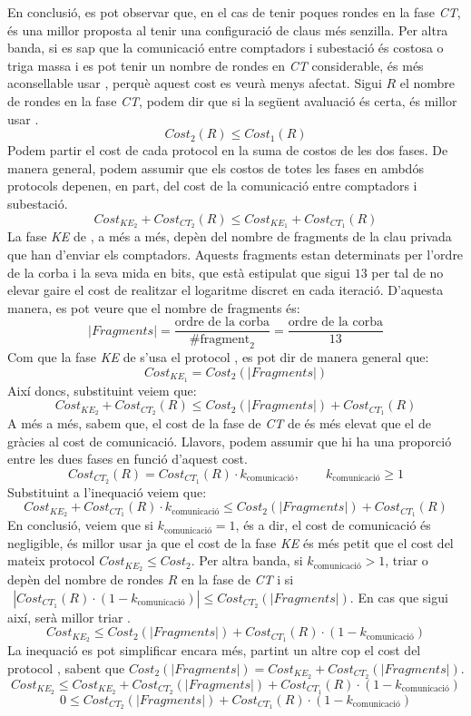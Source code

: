 En conclusió, es pot observar que, en el cas de tenir poques rondes en la fase \textit{CT}, \cite{busom} és una millor proposta al tenir una configuració de claus més senzilla. 
Per altra banda, si es sap que la comunicació entre comptadors i subestació és costosa o triga massa  i es pot tenir un nombre de rondes en \textit{CT} considerable, és més aconsellable usar \cite{recsi}, perquè aquest cost es veurà menys afectat. Sigui $R$ el nombre de rondes en la fase \textit{CT}, podem dir que si la següent avaluació és certa, és millor usar \cite{busom}.
\[Cost_2(R) \le Cost_1(R)\]
Podem partir el cost de cada protocol en la suma de costos de les dos fases. De manera general, podem assumir que els costos de totes les fases en ambdós protocols depenen, en part, del cost de la comunicació entre comptadors i subestació.
\[Cost_{KE_2} + Cost_{CT_2}(R) \le  Cost_{KE_1} + Cost_{CT_1}(R)\]
La fase \textit{KE} de \cite{recsi}, a més a més, depèn del nombre de fragments de la clau privada que han d'enviar els comptadors. Aquests fragments estan determinats per l'ordre de la corba i la seva mida en bits, que està estipulat que sigui $13$ per tal de no elevar gaire el cost de realitzar el logaritme discret en cada iteració. D'aquesta manera, es pot veure que el nombre de fragments és: 
\[|Fragments| = \frac{\textrm{ordre de la corba}}{\#\textrm{fragment}_2} = \frac{\textrm{ordre de la corba}}{13}\]
Com que la fase \textit{KE} de \cite{recsi} s'usa el protocol \cite{busom}, es pot dir de manera general que:
\[Cost_{KE_1} = Cost_2(|Fragments|)\]
Així doncs, substituint veiem que:
\[Cost_{KE_2} + Cost_{CT_2}(R) \le  Cost_{2}(|Fragments|) + Cost_{CT_1}(R)\]
A més a més, sabem que, el cost de la fase de \textit{CT} de \cite{busom} és més elevat que el de \cite{recsi} gràcies al cost de comunicació. Llavors, podem assumir que hi ha una proporció entre les dues fases en funció d'aquest cost.
\[Cost_{CT_2}(R) = Cost_{CT_1}(R) \cdot k_{\textrm{comunicació}}, \qquad k_{\textrm{comunicació}} \ge 1\]
Substituint a l'inequació veiem que:
\[Cost_{KE_2} + Cost_{CT_1}(R) \cdot k_{\textrm{comunicació}} \le  Cost_{2}(|Fragments|) + Cost_{CT_1}(R)\]
En conclusió, veiem que si $k_{\textrm{comunicació}} = 1$, és  a dir, el cost de comunicació és negligible, és millor usar \cite{busom} ja que el cost de la fase \textit{KE} és més petit que el cost del mateix protocol $Cost_{KE_2} \le Cost_{2}$. Per altra banda, si $k_{\textrm{comunicació}} > 1$, triar \cite{recsi} o \cite{busom} depèn del nombre de rondes $R$ en la fase de \textit{CT} i si $\ \ |Cost_{CT_1}(R) \cdot (1 - k_{\textrm{comunicació}})| \le Cost_{CT_2}(|Fragments|)$. En cas que sigui així, serà millor triar \cite{busom}.
\[Cost_{KE_2} \le  Cost_{2}(|Fragments|) + Cost_{CT_1}(R) \cdot (1 - k_{\textrm{comunicació}})\]
La inequació es pot simplificar encara més, partint un altre cop el cost del protocol \cite{busom}, sabent que
$Cost_{2}(|Fragments|) = Cost_{KE_2} + Cost_{CT_2}(|Fragments|)$.
\[Cost_{KE_2} \le  Cost_{KE_2} + Cost_{CT_2}(|Fragments|) + Cost_{CT_1}(R) \cdot (1 - k_{\textrm{comunicació}})\]
\[0 \le Cost_{CT_2}(|Fragments|) + Cost_{CT_1}(R) \cdot (1 - k_{\textrm{comunicació}})\]
